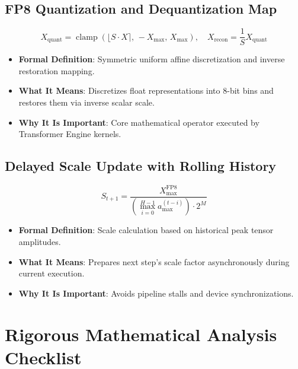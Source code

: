 \documentclass[11pt,a4paper]{article}
\theoremstyle{definition}
\begin{document}
\subsection{FP8 Quantization and Dequantization Map}
{\boldmath
\begin{equation}
X_{\text{quant}} = \operatorname{clamp}\left( \lfloor S \cdot X \rceil, \, -X_{\max}, \, X_{\max} \right), \quad X_{\text{recon}} = \frac{1}{S} X_{\text{quant}}
\end{equation}
}
\begin{itemize}
    \item \textbf{Formal Definition}: Symmetric uniform affine discretization and inverse restoration mapping.
    \item \textbf{What It Means}: Discretizes float representations into 8-bit bins and restores them via inverse scalar scale.
    \item \textbf{Why It Is Important}: Core mathematical operator executed by Transformer Engine kernels.
\end{itemize}

\subsection{Delayed Scale Update with Rolling History}
{\boldmath
\begin{equation}
S_{t+1} = \frac{X_{\max}^{\text{FP8}}}{\left( \max_{i=0}^{H-1} a_{\max}^{(t-i)} \right) \cdot 2^M}
\end{equation}
}
\begin{itemize}
    \item \textbf{Formal Definition}: Scale calculation based on historical peak tensor amplitudes.
    \item \textbf{What It Means}: Prepares next step's scale factor asynchronously during current execution.
    \item \textbf{Why It Is Important}: Avoids pipeline stalls and device synchronizations.
\end{itemize}

\section{Rigorous Mathematical Analysis Checklist}
\end{document}
